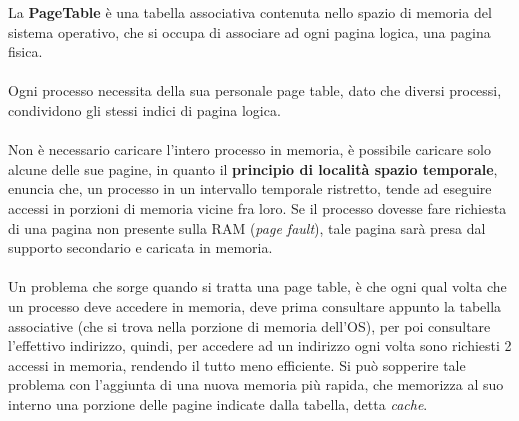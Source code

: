 \documentclass[12pt, letterpaper]{article}
\newcommand{\acc}{\\\hphantom{}\\}
\begin{document}
La \textbf{PageTable} è una tabella associativa contenuta nello spazio di memoria del sistema operativo, che si occupa 
di associare ad ogni pagina logica, una pagina fisica.\acc 
Ogni processo necessita della sua personale page table, dato che diversi processi,
condividono gli stessi indici di pagina logica.\acc 
Non è necessario caricare l'intero processo in memoria, è possibile caricare solo alcune delle sue pagine, in quanto 
il \textbf{principio di località spazio temporale}, enuncia che, un processo in un intervallo temporale 
ristretto, tende ad eseguire accessi in porzioni di memoria vicine fra loro. Se il processo dovesse fare richiesta 
di una pagina non presente sulla RAM (\textit{page fault}), tale pagina sarà presa dal supporto secondario e caricata 
in memoria.\acc 
Un problema che sorge quando si tratta una page table, è che ogni qual volta che un processo deve accedere in memoria, deve 
prima consultare appunto la tabella associative (che si trova nella porzione di memoria dell'OS), per poi consultare 
l'effettivo indirizzo, quindi, per accedere ad un indirizzo ogni volta sono richiesti 2 accessi in memoria, rendendo il tutto 
meno efficiente. Si può sopperire tale problema 
con l’aggiunta di una nuova memoria più rapida, che memorizza al suo interno una porzione 
delle pagine indicate dalla tabella, detta \textit{cache}.
\end{document}
